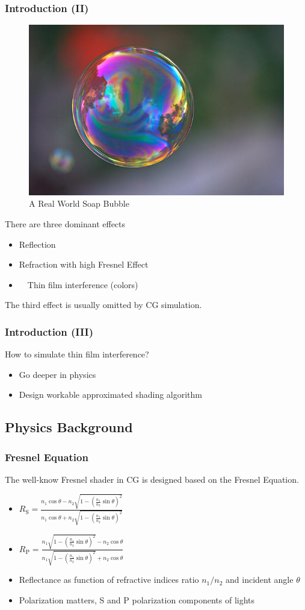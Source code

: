 \documentclass{beamer}
\begin{document}

\begin{frame}
	\frametitle{Introduction (II)}
	\begin{figure}
		\centering
		\includegraphics[width=0.3\linewidth]{real_world_bubble.jpg}
		\caption{A Real World Soap Bubble}
	\end{figure}
	There are three dominant effects
	\begin{itemize}
		\item Reflection 
		\item Refraction with high Fresnel Effect
		\item　Thin film interference (colors)
	\end{itemize}
	The third effect is usually omitted by CG simulation.
\end{frame}


\begin{frame}
	\frametitle{Introduction (III)}
	How to simulate thin film interference?
	\begin{itemize}
		\item Go deeper in physics
		\item Design workable approximated shading algorithm
	\end{itemize}
\end{frame}


\subsection{Physics Background}

\begin{frame}
	\frametitle{Fresnel Equation}
	The well-know Fresnel shader in CG is designed based on the Fresnel Equation.
	\begin{itemize}
		\item $R_{\textrm{S}} = \frac{n_1 \cos\theta - n_2\sqrt{1 - (\frac{n_1}{n_2}\sin\theta)^2}}{n_1 \cos\theta + n_2\sqrt{1 - (\frac{n_1}{n_2}\sin\theta)^2}}$
		\item $R_{\textrm{P}} = \frac{n_1\sqrt{1 - (\frac{n_1}{n_2}\sin\theta)^2} - n_2 \cos\theta}{n_1\sqrt{1 - (\frac{n_1}{n_2}\sin\theta)^2} + n_2 \cos\theta}$
		\item Reflectance as function of refractive indices ratio $n_1/n_2$ and incident angle $\theta$
		\item Polarization matters, \textrm{S} and \textrm{P} polarization components of lights
	\end{itemize}
\end{frame}
\end{document}
